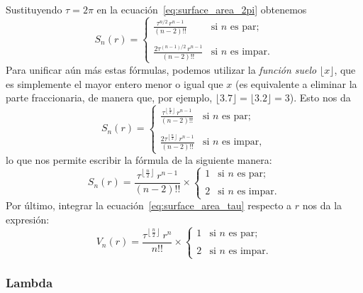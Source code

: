 Sustituyendo $\tau=2\pi$ en la ecuación~\eqref{eq:surface_area_2pi} obtenemos
\[
S_n(r) = \begin{cases}
\displaystyle \frac{\tau^{n/2}\,r^{n-1}}{(n-2)!!} & \text{si } n \text{ es par}; \\ \\
\displaystyle \frac{2\tau^{(n-1)/2}\,r^{n-1}}{(n-2)!!} & \text{si } n \text{ es impar.}
\end{cases} \]
Para unificar aún más estas fórmulas, podemos utilizar la \emph{función suelo} $\lfloor x \rfloor$, que es simplemente el mayor entero menor o igual que $x$ (es equivalente a eliminar la parte fraccionaria, de manera que, por ejemplo, $\lfloor 3.7 \rfloor = \lfloor 3.2 \rfloor = 3$). Esto nos da
\[ S_n(r) = \begin{cases}
 \displaystyle \frac{\tau^{\left\lfloor \frac{n}{2} \right\rfloor}\,r^{n-1}}{(n-2)!!} & \text{si } n \text{ es par}; \\ \\
 \displaystyle \frac{2\tau^{\left\lfloor \frac{n}{2} \right\rfloor}\,r^{n-1}}{(n-2)!!} & \text{si } n \text{ es impar},
 \end{cases} \]
lo que nos permite escribir la fórmula de la siguiente manera:
\begin{equation}
\label{eq:surface_area_tau}
S_n(r) = \frac{\tau^{\left\lfloor \frac{n}{2} \right\rfloor}\,r^{n-1}}{(n-2)!!}\times \begin{cases}
1 & \text{si } n \text{ es par}; \\ \\
2 & \text{si } n \text{ es impar}.
\end{cases}
\end{equation}
Por último, integrar la ecuación~\eqref{eq:surface_area_tau} respecto a $r$ nos da la expresión:
\begin{equation}
\label{eq:volume_tau}
V_n(r) = \frac{\tau^{\left\lfloor \frac{n}{2} \right\rfloor}\,r^n}{n!!}\times \begin{cases}
1 & \text{si } n \text{ es par}; \\ \\
2 & \text{si } n \text{ es impar}.
\end{cases}
\end{equation}

\subsubsection{Lambda} %
\label{sec:lambda}

